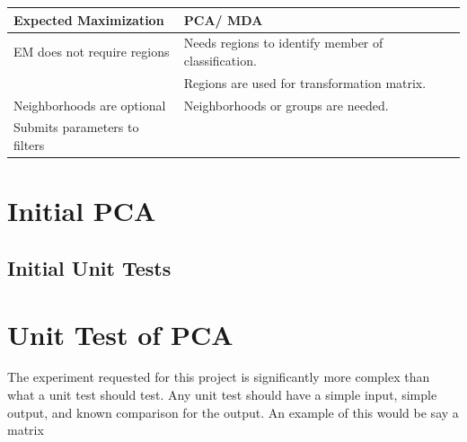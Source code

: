 \documentclass[12pt]{report}
\begin{document}
\begin{tabular}{l|l}
\hline
Expected Maximization & PCA/ MDA\\
\hline
EM does not require regions & Needs regions to identify member of classification.\\
\hline
 & Regions are used for transformation matrix.\\
\hline
Neighborhoods are optional & Neighborhoods or groups are needed.\\
\hline
Submits parameters to filters & \\
\hline
\end{tabular}



\section{Initial PCA} 

\subsection{Initial Unit Tests}

\section{Unit Test of PCA}
The experiment requested for this project is significantly more complex than what a unit test should test.  Any unit test should have a simple input, simple output, and known comparison for the output.   An example of this would be say a matrix 
\end{document}

